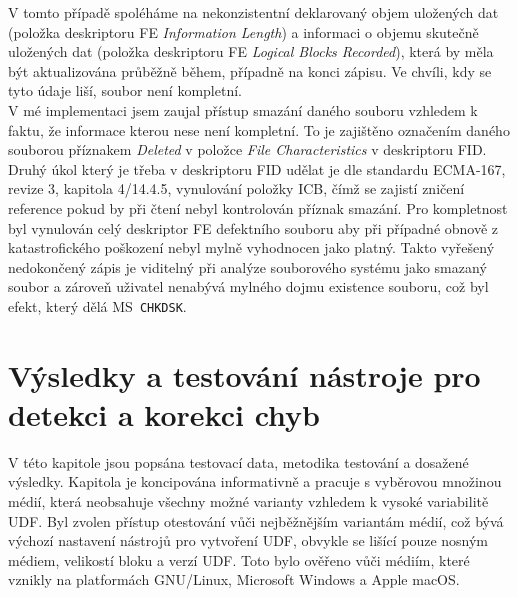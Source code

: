 V tomto případě spoléháme na nekonzistentní deklarovaný objem uložených dat (položka deskriptoru FE \textit{Information Length}) a informaci o objemu skutečně uložených dat (položka deskriptoru FE \textit{Logical Blocks Recorded}), která by měla být aktualizována průběžně během, případně na konci zápisu. Ve chvíli, kdy se tyto údaje liší, soubor není kompletní.\\
V mé implementaci jsem zaujal přístup smazání daného souboru vzhledem k faktu, že informace kterou nese není kompletní. To je zajištěno označením daného souborou příznakem \textit{Deleted} v položce \textit{File Characteristics} v deskriptoru FID. Druhý úkol který je třeba v deskriptoru FID udělat je dle standardu ECMA-167\cite{ecma-167}, revize 3, kapitola 4/14.4.5, vynulování položky ICB, čímž se zajistí zničení reference pokud by při čtení nebyl kontrolován příznak smazání. Pro kompletnost byl vynulován celý deskriptor FE defektního souboru aby při případné obnově z katastrofického poškození nebyl mylně vyhodnocen jako platný. Takto vyřešený nedokončený zápis je viditelný při analýze souborového systému jako smazaný soubor a zároveň uživatel nenabývá mylného dojmu existence souboru, což byl efekt, který dělá MS~\texttt{CHKDSK}.

\chapter{Výsledky a testování nástroje pro detekci a korekci chyb}
\label{ch:results}
V této kapitole jsou popsána testovací data, metodika testování a dosažené výsledky. Kapitola je koncipována informativně a pracuje s vyběrovou množinou médií, která neobsahuje všechny možné varianty vzhledem k vysoké variabilitě UDF. Byl zvolen přístup otestování vůči nejběžnějším variantám médií, což bývá výchozí nastavení nástrojů pro vytvoření UDF, obvykle se lišící pouze nosným médiem, velikostí bloku a verzí UDF. Toto bylo ověřeno vůči médiím, které vznikly na platformách \mbox{GNU/Linux}, Microsoft Windows a Apple macOS. 

